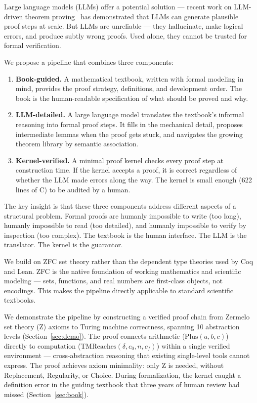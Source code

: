 \documentclass[letterpaper]{article}
\begin{document}
Large language models (LLMs) offer a potential solution --- recent work on
LLM-driven theorem
proving~\citep{alphaproof2024,polu2020generative,deepseekprover2024,dsp2023}
has demonstrated that LLMs can generate plausible proof steps at scale. But LLMs
are unreliable --- they hallucinate, make logical errors, and produce subtly
wrong proofs. Used alone, they cannot be trusted for formal verification.

We propose a pipeline that combines three components:

\begin{enumerate}
  \item \textbf{Book-guided.} A mathematical textbook, written with formal
    modeling in mind, provides the proof strategy, definitions, and
    development order. The book is the human-readable specification of what
    should be proved and why.
  \item \textbf{LLM-detailed.} A large language model translates the
    textbook's informal reasoning into formal proof steps. It fills in the
    mechanical detail, proposes intermediate lemmas when the proof gets stuck,
    and navigates the growing theorem library by semantic association.
  \item \textbf{Kernel-verified.} A minimal proof kernel checks every proof
    step at construction time. If the kernel accepts a proof, it is correct
    regardless of whether the LLM made errors along the way. The kernel is
    small enough (622 lines of C) to be audited by a human.
\end{enumerate}

The key insight is that these three components address different aspects of a
structural problem. Formal proofs are humanly impossible to write (too long),
humanly impossible to read (too detailed), and humanly impossible to verify by
inspection (too complex). The textbook is the human interface. The LLM is the
translator. The kernel is the guarantor.

We build on ZFC set theory rather than the dependent type theories used by
Coq and Lean. ZFC is the native foundation of working mathematics and
scientific modeling --- sets, functions, and real numbers are first-class
objects, not encodings. This makes the pipeline directly applicable to
standard scientific textbooks.

We demonstrate the pipeline by constructing a verified proof chain from
Zermelo set theory (Z) axioms to Turing machine correctness, spanning
10 abstraction levels (Section~\ref{sec:demo}). The proof connects
arithmetic ($\text{Plus}(a,b,c)$) directly to computation
($\text{TMReaches}(\delta, c_0, n, c_f)$) within a single verified
environment --- cross-abstraction reasoning that existing single-level
tools cannot express. The proof achieves axiom minimality: only Z is
needed, without Replacement, Regularity, or Choice. During formalization,
the kernel caught a definition error in the guiding textbook that three
years of human review had missed (Section~\ref{sec:book}).
\end{document}
